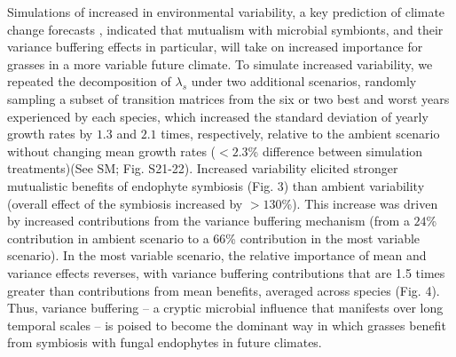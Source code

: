 \documentclass[12pt]{article}
\begin{document}
Simulations of increased in environmental variability, a key prediction of climate change forecasts \cite{ipcc_2021}, indicated that mutualism with microbial symbionts, and their variance buffering effects in particular, will take on increased importance for grasses in a more variable future climate.
To simulate increased variability, we repeated the decomposition of $\lambda_s$ under two additional scenarios, randomly sampling a subset of transition matrices from the six or two best and worst years experienced by each species, which increased the standard deviation of yearly growth rates by $1.3$ and $2.1$ times, respectively, relative to the ambient scenario without changing mean growth rates ($<2.3$\% difference between simulation treatments)(See SM; Fig. S21-22).
Increased variability elicited stronger mutualistic benefits of endophyte symbiosis (Fig. 3) than ambient variability (overall effect of the symbiosis increased by $>130 $\%).
This increase was driven by increased contributions from the variance buffering mechanism (from a $24$\% contribution in ambient scenario to a $66$\% contribution in the most variable scenario).
In the most variable scenario, the relative importance of mean and variance effects reverses, with variance buffering contributions that are 1.5 times greater than contributions from mean benefits, averaged across species (Fig. 4). 
Thus, variance buffering -- a cryptic microbial influence that manifests over long temporal scales -- is poised to become the dominant way in which grasses benefit from symbiosis with fungal endophytes in future climates. 
\end{document}
